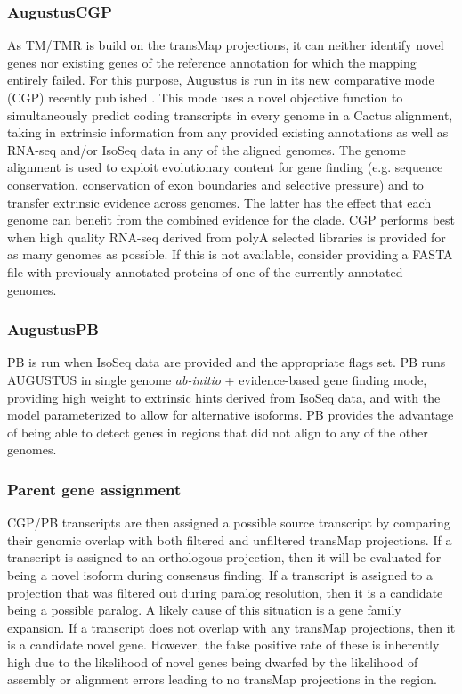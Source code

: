 \documentclass[fleqn,10pt]{wlscirep}
\begin{document}
\subsubsection*{AugustusCGP}
	As TM/TMR is build on the transMap projections, it can neither identify novel genes nor existing genes of the reference annotation for which the mapping entirely failed. For this purpose, Augustus is run in its new comparative mode (CGP) recently published \cite{konig2015simultaneous}. This mode uses a novel objective function to simultaneously predict coding transcripts in every genome in a Cactus alignment, taking in extrinsic information from any provided existing annotations as well as RNA-seq and/or IsoSeq data in any of the aligned genomes. The genome alignment is used to exploit evolutionary content for gene finding (e.g. sequence conservation, conservation of exon boundaries and selective pressure) and to transfer extrinsic evidence across genomes. The latter has the effect that each genome can benefit from the combined evidence for the clade. CGP performs best when high quality RNA-seq derived from polyA selected libraries is provided for as many genomes as possible. If this is not available, consider providing a FASTA file with previously annotated proteins of one of the currently annotated genomes. 
    
\subsubsection*{AugustusPB}
	PB is run when IsoSeq data are provided and the appropriate flags set. PB runs AUGUSTUS in single genome \textit{ab-initio} + evidence-based gene finding mode, providing high weight to extrinsic hints derived from IsoSeq data, and with the model parameterized to allow for alternative isoforms. PB provides the advantage of being able to detect genes in regions that did not align to any of the other genomes.
    
\subsubsection*{Parent gene assignment}
CGP/PB transcripts are then assigned a possible source transcript by comparing their genomic overlap with both filtered and unfiltered transMap projections. If a transcript is assigned to an orthologous projection, then it will be evaluated for being a novel isoform during consensus finding. If a transcript is assigned to a projection that was filtered out during paralog resolution, then it is a candidate being a possible paralog. A likely cause of this situation is a gene family expansion. If a transcript does not overlap with any transMap projections, then it is a candidate novel gene. However, the false positive rate of these is inherently high due to the likelihood of novel genes being dwarfed by the likelihood of assembly or alignment errors leading to no transMap projections in the region.
\end{document}
